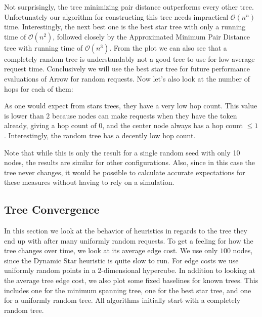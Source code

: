\documentclass[a4paper, oneside]{discothesis}
\begin{document}
Not surprisingly, the tree minimizing pair distance outperforms every other tree. Unfortunately our algorithm for constructing this tree needs impractical $\mathcal{O}(n^n)$ time. Interestingly, the next best one is the best star tree with only a running time of $\mathcal{O}(n^2)$, followed closely by the Approximated Minimum Pair Distance tree with running time of $\mathcal{O}(n^3)$. From the plot we can also see that a completely random tree is understandably not a good tree to use for low average request time. Conclusively we will use the best star tree for future performance evaluations of Arrow for random requests. Now let's also look at the number of hops for each of them:


As one would expect from stars trees, they have a very low hop count. This value is lower than $2$ because nodes can make requests when they have the token already, giving a hop count of $0$, and the center node always has a hop count $\leq 1$. Interestingly, the random tree has a decently low hop count.

Note that while this is only the result for a single random seed with only 10 nodes, the results are similar for other configurations. Also, since in this case the tree never changes, it would be possible to calculate accurate expectations for these measures without having to rely on a simulation.

\subsection{Tree Convergence}\label{result:convergence}

In this section we look at the behavior of heuristics in regards to the tree they end up with after many uniformly random requests. To get a feeling for how the tree changes over time, we look at its average edge cost. We use only $100$ nodes, since the Dynamic Star heuristic is quite slow to run. For edge costs we use uniformly random points in a 2-dimensional hypercube. In addition to looking at the average tree edge cost, we also plot some fixed baselines for known trees. This includes one for the minimum spanning tree, one for the best star tree, and one for a uniformly random tree. All algorithms initially start with a completely random tree.
\end{document}
